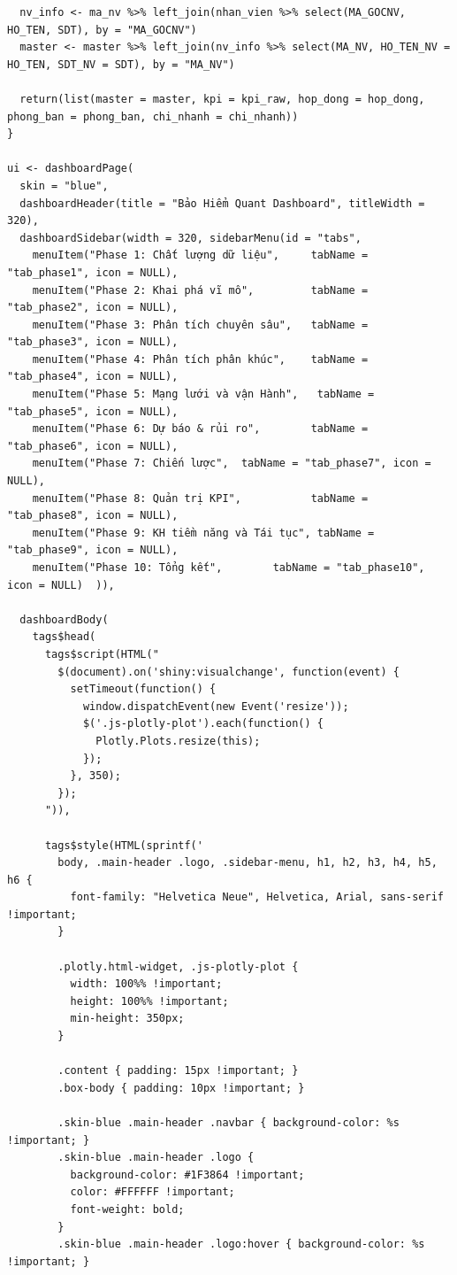 \documentclass[12pt, a4paper]{article}
\begin{document}
\begin{lstlisting}
  nv_info <- ma_nv %>% left_join(nhan_vien %>% select(MA_GOCNV, HO_TEN, SDT), by = "MA_GOCNV")
  master <- master %>% left_join(nv_info %>% select(MA_NV, HO_TEN_NV = HO_TEN, SDT_NV = SDT), by = "MA_NV")
  
  return(list(master = master, kpi = kpi_raw, hop_dong = hop_dong, phong_ban = phong_ban, chi_nhanh = chi_nhanh))
}

ui <- dashboardPage(
  skin = "blue",
  dashboardHeader(title = "Bảo Hiểm Quant Dashboard", titleWidth = 320),
  dashboardSidebar(width = 320, sidebarMenu(id = "tabs",
    menuItem("Phase 1: Chất lượng dữ liệu",     tabName = "tab_phase1", icon = NULL),
    menuItem("Phase 2: Khai phá vĩ mô",         tabName = "tab_phase2", icon = NULL),
    menuItem("Phase 3: Phân tích chuyên sâu",   tabName = "tab_phase3", icon = NULL),
    menuItem("Phase 4: Phân tích phân khúc",    tabName = "tab_phase4", icon = NULL),
    menuItem("Phase 5: Mạng lưới và vận Hành",   tabName = "tab_phase5", icon = NULL),
    menuItem("Phase 6: Dự báo & rủi ro",        tabName = "tab_phase6", icon = NULL),
    menuItem("Phase 7: Chiến lược",  tabName = "tab_phase7", icon = NULL),
    menuItem("Phase 8: Quản trị KPI",           tabName = "tab_phase8", icon = NULL),
    menuItem("Phase 9: KH tiềm năng và Tái tục", tabName = "tab_phase9", icon = NULL),
    menuItem("Phase 10: Tổng kết",        tabName = "tab_phase10", icon = NULL)  )),
  
  dashboardBody(
    tags$head(
      tags$script(HTML("
        $(document).on('shiny:visualchange', function(event) {
          setTimeout(function() {
            window.dispatchEvent(new Event('resize'));
            $('.js-plotly-plot').each(function() {
              Plotly.Plots.resize(this);
            });
          }, 350); 
        });
      ")),
      
      tags$style(HTML(sprintf('
        body, .main-header .logo, .sidebar-menu, h1, h2, h3, h4, h5, h6 { 
          font-family: "Helvetica Neue", Helvetica, Arial, sans-serif !important; 
        }

        .plotly.html-widget, .js-plotly-plot {
          width: 100%% !important;
          height: 100%% !important;
          min-height: 350px;
        }
        
        .content { padding: 15px !important; }
        .box-body { padding: 10px !important; }

        .skin-blue .main-header .navbar { background-color: %s !important; }
        .skin-blue .main-header .logo { 
          background-color: #1F3864 !important; 
          color: #FFFFFF !important; 
          font-weight: bold; 
        }
        .skin-blue .main-header .logo:hover { background-color: %s !important; }
        

\end{lstlisting}
\end{document}
